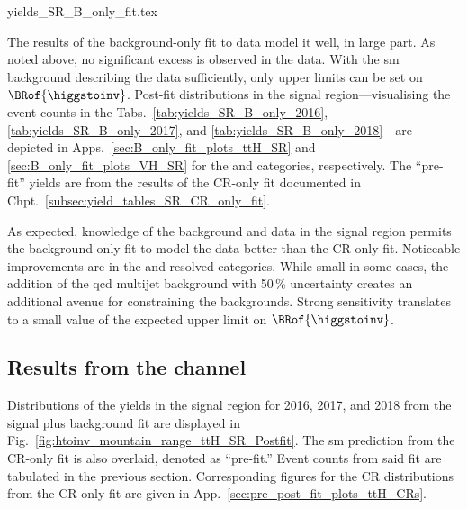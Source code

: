 \clearpage




{yields_SR_B_only_fit.tex}

\clearpage

The results of the background-only fit to data model it well, in large part. As noted above, no significant excess is observed in the data. With the \acrshort{sm} background describing the data sufficiently, only upper limits can be set on $\BRof{\higgstoinv}$. Post-fit distributions in the signal region---visualising the event counts in the Tabs.~\ref{tab:yields_SR_B_only_2016}, \ref{tab:yields_SR_B_only_2017}, and \ref{tab:yields_SR_B_only_2018}---are depicted in Apps.~\ref{sec:B_only_fit_plots_ttH_SR} and \ref{sec:B_only_fit_plots_VH_SR} for the \ttH and \VH categories, respectively. The ``pre-fit'' yields are from the results of the \gls{CR}-only fit documented in Chpt.~\ref{subsec:yield_tables_SR_CR_only_fit}.

As expected, knowledge of the background and data in the signal region permits the background-only fit to model the data better than the \gls{CR}-only fit. Noticeable improvements are in the \ttH and \VH resolved categories. While small in some cases, the addition of the \acrshort{qcd} multijet background with 50\,\% uncertainty creates an additional avenue for constraining the backgrounds. Strong sensitivity translates to a small value of the expected upper limit on $\BRof{\higgstoinv}$.




\subsection{Results from the \texorpdfstring{\ttH}{ttH} channel}
\label{subsec:htoinv_results_ttH}

Distributions of the yields in the signal region for 2016, 2017, and 2018 from the signal plus background fit are displayed in Fig.~\ref{fig:htoinv_mountain_range_ttH_SR_Postfit}. The \acrshort{sm} prediction from the \gls{CR}-only fit is also overlaid, denoted as ``pre-fit.'' Event counts from said fit are tabulated in the previous section. Corresponding figures for the \gls{CR} distributions from the \gls{CR}-only fit are given in App.~\ref{sec:pre_post_fit_plots_ttH_CRs}.


